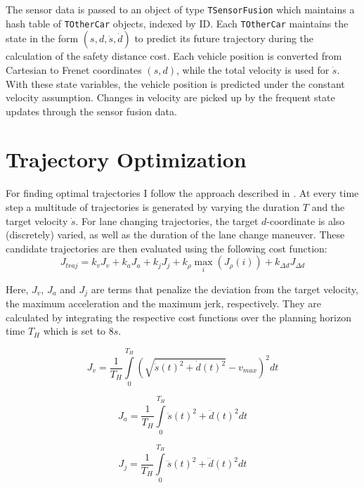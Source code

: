 \documentclass[twoside]{article}
\newcommand{\code}[1]{{\texttt{#1}}}
\begin{document}
The sensor data is passed to an object of type \code{TSensorFusion} which maintains a hash table of
\code{TOtherCar} objects, indexed by ID. Each \code{TOtherCar} maintains the state in
the form $(s,d,\dot s, \dot d)$ to predict its future trajectory during the calculation of the safety distance cost. Each vehicle position is converted from Cartesian to Frenet coordinates $(s,d)$, while the total velocity is used for $\dot s$. With these state variables, the
vehicle position is predicted under the constant velocity assumption. Changes in velocity are
picked up by the frequent state updates through the sensor fusion data.
\section{Trajectory Optimization}
For finding optimal trajectories I follow the approach described in \cite{werling2010optimal}.
At every time step a multitude of trajectories is generated by varying the duration $T$ and
the target velocity $\dot s$. For lane changing trajectories, the target $d$-coordinate is also
(discretely) varied, as well as the duration of the lane change maneuver. These candidate trajectories are then evaluated using the following cost function:
\begin{equation}
J_{traj} = k_v J_{v} + k_a J_{a} + k_j J_{j} +  k_{\rho} \underset{i}\max(J_{\rho}(i)) + k_{\Delta d}J_{\Delta d} %
\end{equation}

Here, $J_{v}$, $J_{a}$ and $J_{j}$ are terms that penalize the deviation from the target velocity,
the maximum acceleration and the maximum jerk, respectively. They are calculated by integrating
the respective cost functions over the planning horizon time $T_H$ which is set to $8s$.

\begin{equation}
J_{v} = \frac{1}{T_H}\int\limits_0^{T_{H}} \left(\sqrt{\dot s(t)^2 + \dot d(t)^2} - v_{max}\right)^2 dt
\end{equation}

\begin{equation}
J_{a} = \frac{1}{T_H}\int\limits_0^{T_{H}}\ddot s(t)^2 + \ddot d(t)^2 dt
\end{equation}

\begin{equation}
J_{j} = \frac{1}{T_H}\int\limits_0^{T_{H}}\dddot s(t)^2 + \dddot d(t)^2 dt
\end{equation}
\end{document}
